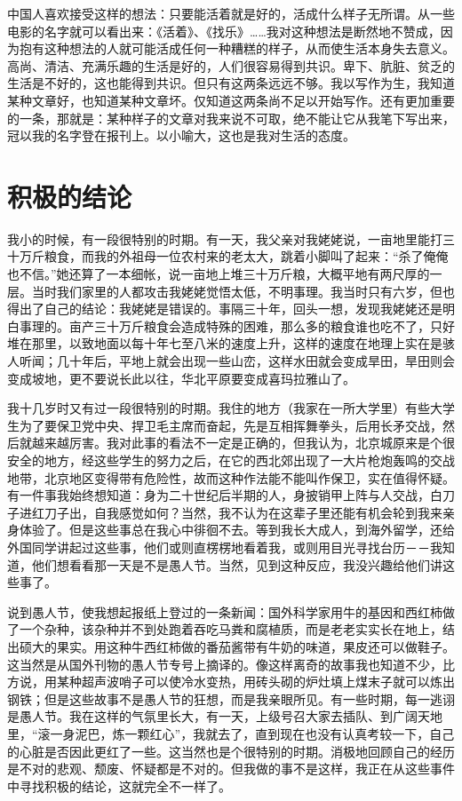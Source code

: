 中国人喜欢接受这样的想法：只要能活着就是好的，活成什么样子无所谓。从一些电影的名字就可以看出来：《活着》、《找乐》……我对这种想法是断然地不赞成，因为抱有这种想法的人就可能活成任何一种糟糕的样子，从而使生活本身失去意义。高尚、清洁、充满乐趣的生活是好的，人们很容易得到共识。卑下、肮脏、贫乏的生活是不好的，这也能得到共识。但只有这两条远远不够。我以写作为生，我知道某种文章好，也知道某种文章坏。仅知道这两条尚不足以开始写作。还有更加重要的一条，那就是：某种样子的文章对我来说不可取，绝不能让它从我笔下写出来，冠以我的名字登在报刊上。以小喻大，这也是我对生活的态度。

\chapter{积极的结论}

我小的时候，有一段很特别的时期。有一天，我父亲对我姥姥说，一亩地里能打三十万斤粮食，而我的外祖母一位农村来的老太大，跳着小脚叫了起来：“杀了俺俺也不信。”她还算了一本细帐，说一亩地上堆三十万斤粮，大概平地有两尺厚的一层。当时我们家里的人都攻击我姥姥觉悟太低，不明事理。我当时只有六岁，但也得出了自己的结论：我姥姥是错误的。事隔三十年，回头一想，发现我姥姥还是明白事理的。亩产三十万斤粮食会造成特殊的困难，那么多的粮食谁也吃不了，只好堆在那里，以致地面以每十年七至八米的速度上升，这样的速度在地理上实在是骇人听闻；几十年后，平地上就会出现一些山峦，这样水田就会变成旱田，旱田则会变成坡地，更不要说长此以往，华北平原要变成喜玛拉雅山了。 

我十几岁时又有过一段很特别的时期。我住的地方（我家在一所大学里）有些大学生为了要保卫党中央、捍卫毛主席而奋起，先是互相挥舞拳头，后用长矛交战，然后就越来越厉害。我对此事的看法不一定是正确的，但我认为，北京城原来是个很安全的地方，经这些学生的努力之后，在它的西北郊出现了一大片枪炮轰鸣的交战地带，北京地区变得带有危险性，故而这种作法能不能叫作保卫，实在值得怀疑。有一件事我始终想知道：身为二十世纪后半期的人，身披销甲上阵与人交战，白刀子进红刀子出，自我感觉如何？当然，我不认为在这辈子里还能有机会轮到我来亲身体验了。但是这些事总在我心中徘徊不去。等到我长大成人，到海外留学，还给外国同学讲起过这些事，他们或则直楞楞地看着我，或则用目光寻找台历－－我知道，他们想看看那一天是不是愚人节。当然，见到这种反应，我没兴趣给他们讲这些事了。 

说到愚人节，使我想起报纸上登过的一条新闻：国外科学家用牛的基因和西红柿做了一个杂种，该杂种并不到处跑着吞吃马粪和腐植质，而是老老实实长在地上，结出硕大的果实。用这种牛西红柿做的番茄酱带有牛奶的味道，果皮还可以做鞋子。这当然是从国外刊物的愚人节专号上摘译的。像这样离奇的故事我也知道不少，比方说，用某种超声波哨子可以使冷水变热，用砖头砌的炉灶填上煤末子就可以炼出钢铁；但是这些故事不是愚人节的狂想，而是我亲眼所见。有一些时期，每一逃诩是愚人节。我在这样的气氛里长大，有一天，上级号召大家去插队、到广阔天地里，“滚一身泥巴，炼一颗红心”，我就去了，直到现在也没有认真考较一下，自己的心脏是否因此更红了一些。这当然也是个很特别的时期。消极地回顾自己的经历是不对的悲观、颓废、怀疑都是不对的。但我做的事不是这样，我正在从这些事件中寻找积极的结论，这就完全不一样了。 

